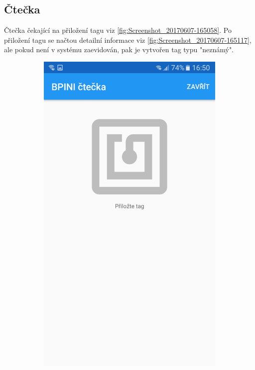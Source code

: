 \documentclass[czech,BP]{thesiskiv}
\begin{document}
\subsection{Čtečka}
Čtečka čekající na přiložení tagu viz \ref{fig:Screenshot_20170607-165058}.
Po přiložení tagu se načtou detailní informace viz \ref{fig:Screenshot_20170607-165117}, ale pokud není v systému zaevidován, pak je vytvořen tag typu "neznámý".
\begin{figure}[H]
	\centering
  \begin{subfigure}[b]{0.3\textwidth}
    \centering
	\includegraphics[width=\textwidth]{../images/client_android/Screenshot_20170607-165058.png}	

\end{subfigure}
\end{figure}
\end{document}
